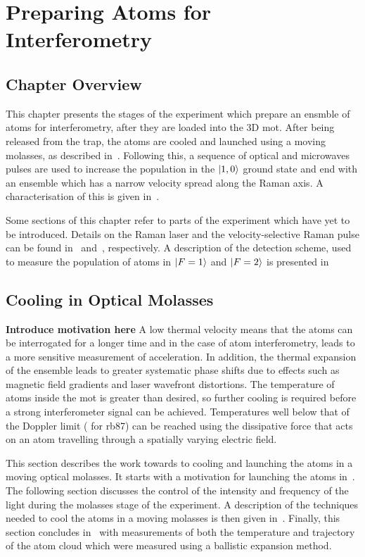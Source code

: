 \chapter{Preparing Atoms for Interferometry}\label{chap:atom_prep}
\section{Chapter Overview}
This chapter presents the stages of the experiment which prepare an ensmble of atoms for interferometry, after they are loaded into the 3D \ac{mot}. After being released from the trap, the atoms are cooled and launched using a moving molasses, as described in~. Following this, a sequence of optical and microwaves pulses are used to increase the population in the \(\ket{1,0}\) ground state and end with an ensemble which has a narrow velocity spread along the Raman axis. A characterisation of this is given in~.
\par\noindent
Some sections of this chapter refer to parts of the experiment which have yet to be introduced. Details on the Raman laser and the velocity-selective Raman pulse can be found in~ and~, respectively. A description of the detection scheme, used to measure the population of atoms in \(\ket{F=1}\) and \(\ket{F=2}\) is presented in~


\section{Cooling in Optical Molasses}\label{sec:optical_molasses}
{\textbf{Introduce motivation here}}
A low thermal velocity means that the atoms can be interrogated for a longer time and in the case of atom interferometry, leads to a more sensitive measurement of acceleration. In addition, the thermal expansion of the ensemble leads to greater systematic phase shifts due to effects such as magnetic field gradients and laser wavefront distortions. The temperature of atoms inside the \ac{mot} is greater than desired, so further cooling is required before a strong interferometer signal can be achieved. Temperatures well below that of the Doppler limit ( for \ac{rb87}) can be reached using the dissipative force that acts on an atom travelling through a spatially varying electric field. 

\par\noindent
This section describes the work towards to cooling and launching the atoms in a moving optical molasses. It starts with a motivation for launching the atoms in~. The following section discusses the control of the intensity and frequency of the light during the molasses stage of the experiment. A description of the techniques needed to cool the atoms in a moving molasses is then given in~. Finally, this section concludes in~ with measurements of both the temperature and trajectory of the atom cloud which were measured using a ballistic expansion method.


